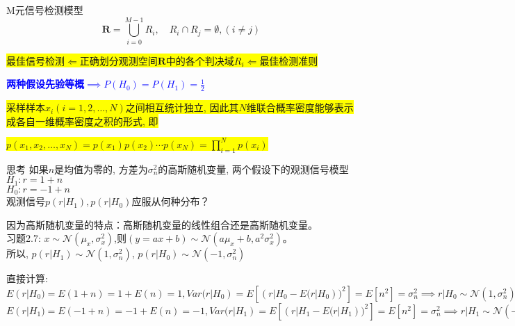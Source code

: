 \begin{frame}{M元信号检测模型}
\[\bm{R}=\bigcup\limits_{i=0}^{M-1}R_i, \quad R_i\cap R_j=\emptyset,(i\ne j) \]

\bigskip

\colorbox{yellow}{最佳信号检测$\Leftarrow$正确划分观测空间$\bm{R}$中的各个判决域$R_i\Leftarrow$最佳检测准则} 

\bigskip

\textcolor{blue}{\textbf{两种假设先验等概$\implies P(H_0)=P(H_1)=\frac{1}{2}$}}

\bigskip


\tiny{
\colorbox{yellow}{采样样本$x_i(i=1,2,\dots,N)$之间相互统计独立, 因此其$N$维联合概率密度能够表示成各自一维概率密度之积的形式, 即}\\
}

\colorbox{yellow}{$p(x_1,x_2,\dots,x_N)=p(x_1)p(x_2)\cdots p(x_N)=\prod\limits_{i=1}^Np(x_i)$} 
\end{frame}

\begin{frame}[shrink]
\begin{block}{思考}
	如果$n$是均值为零的, 方差为$\sigma_n^2$的高斯随机变量, 两个假设下的观测信号模型\\
	$H_1: r=1+n$\\
	$H_0: r=-1+n$\\
	观测信号$p(r|H_1),p(r|H_0)$应服从何种分布？
\end{block}
\begin{block}{}
	因为高斯随机变量的特点：高斯随机变量的线性组合还是高斯随机变量。\\
	习题2.7: $x\sim\mathcal{N}(\mu_x,\sigma_x^2)$,则$(y=ax+b)\sim\mathcal{N}(a\mu_x+b,a^2\sigma_x^2)$。\\
	所以, $p(r|H_1)\sim\mathcal{N}(1,\sigma_n^2)$, $p(r|H_0)\sim\mathcal{N}(-1,\sigma_n^2)$
\end{block}
\begin{block}{}
	直接计算: $E(r|H_0)=E(1+n)=1+E(n)=1,Var(r|H_0)=E[(r|H_0-E(r|H_0))^2]=E[n^2]=\sigma_n^2\implies r|H_0\sim\mathcal{N}(1,\sigma_n^2)$\\
	$E(r|H_1)=E(-1+n)=-1+E(n)=-1,Var(r|H_1)=E[(r|H_1-E(r|H_1))^2]=E[n^2]=\sigma_n^2\implies r|H_1\sim\mathcal{N}(-1,\sigma_n^2)$
\end{block}
\end{frame}

